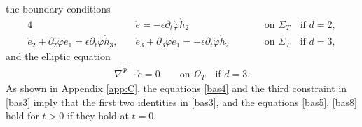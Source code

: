\documentclass[twoside,11pt]{article}
\numberwithin{equation}{section}
\def\p{\partial}
\begin{document}
the boundary conditions
\begin{alignat}{4}
		\label{bas6}	
	&\mathring{e}=-\epsilon\p_t\mathring{\varphi}\mathring{h}_2
\qquad &&\textrm{on }\Sigma_T\quad \textrm{if }d=2,\\[1mm]
		\label{bas7}	
\mathring{e}_2+\p_2 \mathring\varphi \mathring{e}_1=\epsilon \p_t \mathring\varphi \mathring{h}_3,\quad
&\mathring{e}_3+\p_3 \mathring\varphi \mathring{e}_1=-\epsilon \p_t \mathring\varphi \mathring{h}_2		
\qquad &&\textrm{on }\Sigma_T\quad \textrm{if }d=3,
\end{alignat}
and the elliptic equation
\begin{align} \label{bas8}
			\nabla^{\mathring{\Phi}^-}\cdot \mathring{e}=0	
					\qquad   \textrm{on } {\Omega_T}\quad \textrm{if }d=3.
\end{align}	
As shown in Appendix \ref{app:C}, the equations \eqref{bas4} and the third constraint in \eqref{bas3} imply that the first two identities in \eqref{bas3}, and the equations \eqref{bas5}, \eqref{bas8} hold for $t>0$ if they hold at $t=0$.
	
	
\end{document}
